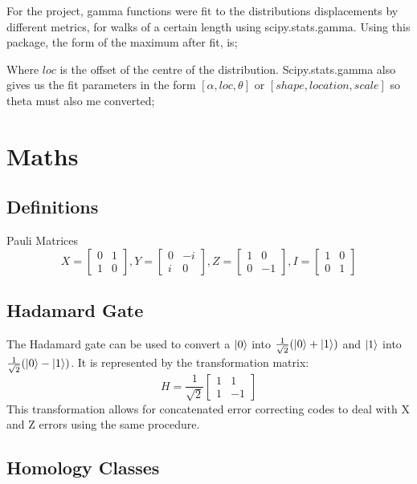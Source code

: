 For the project, gamma functions were fit to the distributions displacements by different metrics, for walks of a certain length using scipy.stats.gamma. Using this package, the form of the maximum after fit, is;

Where $loc$ is the offset of the centre of the distribution.
Scipy.stats.gamma also gives us the fit parameters in the form $[\alpha, loc, \theta ]$ or $[shape, location, scale]$ so theta must also me converted;
\begin{figure}

\end{figure}


		\section{Maths}
		\subsection{Definitions}
		\label{app:pauli}
		Pauli Matrices
		\[
		X = 
		\begin{bmatrix}
		0 & 1 \\
		1 & 0
		\end{bmatrix}
		, Y = 
		\begin{bmatrix}
		0  & -i \\
		i & 0
		\end{bmatrix}
		, Z = 
		\begin{bmatrix}
		1  & 0 \\
		0 & -1
		\end{bmatrix}
		, I = 
		\begin{bmatrix}
		1  & 0 \\
		0 & 1
		\end{bmatrix}
		\label{fig:pauli}
		\]
\subsection{Hadamard Gate}
\label{app:hadamard}
		The Hadamard gate can be used to convert a $\ket{0}$ into $ \frac{1}{\sqrt{2}}(\ket{0} +\ket{1})$ and $\ket{1}$ into $ \frac{1}{\sqrt{2}}(\ket{0} -\ket{1})$.
		It is represented by the transformation matrix:
		\[ H = 
				\frac{1}{\sqrt{2}}\begin{bmatrix}
				1  & 1 \\
				1 & -1
				\end{bmatrix}
				\]
		This transformation allows for concatenated error correcting codes to deal with X and Z errors using the same procedure. 
		\subsection{Homology Classes}
		\label{app:cycles}

